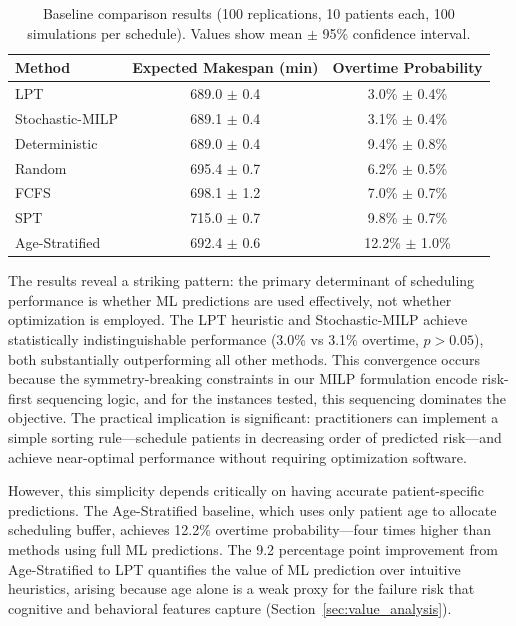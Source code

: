 \documentclass[msom,blindrev]{informs3}
\begin{document}
\begin{table}[htbp]
\centering
\caption{Baseline comparison results (100 replications, 10 patients each, 100 simulations per schedule). Values show mean $\pm$ 95\% confidence interval.}
\label{tab:baseline_results}
\begin{tabular}{@{}lcc@{}}
\toprule
\textbf{Method} & \textbf{Expected Makespan (min)} & \textbf{Overtime Probability} \\
\midrule
LPT & 689.0 $\pm$ 0.4 & 3.0\% $\pm$ 0.4\% \\
Stochastic-MILP & 689.1 $\pm$ 0.4 & 3.1\% $\pm$ 0.4\% \\
Deterministic & 689.0 $\pm$ 0.4 & 9.4\% $\pm$ 0.8\% \\
Random & 695.4 $\pm$ 0.7 & 6.2\% $\pm$ 0.5\% \\
FCFS & 698.1 $\pm$ 1.2 & 7.0\% $\pm$ 0.7\% \\
SPT & 715.0 $\pm$ 0.7 & 9.8\% $\pm$ 0.7\% \\
Age-Stratified & 692.4 $\pm$ 0.6 & 12.2\% $\pm$ 1.0\% \\
\bottomrule
\end{tabular}
\end{table}

The results reveal a striking pattern: the primary determinant of scheduling performance is whether ML predictions are used effectively, not whether optimization is employed. The LPT heuristic and Stochastic-MILP achieve statistically indistinguishable performance (3.0\% vs 3.1\% overtime, $p > 0.05$), both substantially outperforming all other methods. This convergence occurs because the symmetry-breaking constraints in our MILP formulation encode risk-first sequencing logic, and for the instances tested, this sequencing dominates the objective. The practical implication is significant: practitioners can implement a simple sorting rule---schedule patients in decreasing order of predicted risk---and achieve near-optimal performance without requiring optimization software.

However, this simplicity depends critically on having accurate patient-specific predictions. The Age-Stratified baseline, which uses only patient age to allocate scheduling buffer, achieves 12.2\% overtime probability---four times higher than methods using full ML predictions. The 9.2 percentage point improvement from Age-Stratified to LPT quantifies the value of ML prediction over intuitive heuristics, arising because age alone is a weak proxy for the failure risk that cognitive and behavioral features capture (Section~\ref{sec:value_analysis}).
\end{document}
